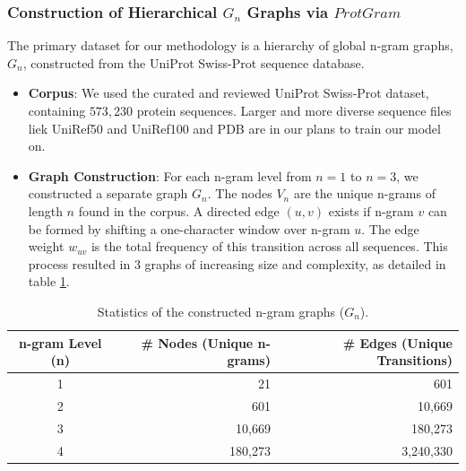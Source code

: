 \documentclass[utf8]{FrontiersinHarvard}
\begin{document}
	\subsubsection{Construction of Hierarchical $G_{n}$ Graphs via $ProtGram$}
	The primary dataset for our methodology is a hierarchy of global n-gram graphs, $G_{n}$, constructed from the UniProt Swiss-Prot sequence database.
	\begin{itemize}
		\item \textbf{Corpus}: We used the curated and reviewed UniProt Swiss-Prot dataset, containing $573,230$ protein sequences. Larger and more diverse sequence files liek UniRef50 and UniRef100 and PDB are in our plans to train our model on.
		\item \textbf{Graph Construction}: For each n-gram level from $n=1$ to $n=3$, we constructed a separate graph $G_{n}$. The nodes $V_{n}$ are the unique n-grams of length $n$ found in the corpus. A directed edge $(u, v)$ exists if n-gram $v$ can be formed by shifting a one-character window over n-gram $u$. The edge weight $w_{uv}$ is the total frequency of this transition across all sequences. This process resulted in $3$ graphs of increasing size and complexity, as detailed in table \ref{tab:gn_stats}.
	\end{itemize}
	
	\begin{table}[h!]
		\centering
		\caption{Statistics of the constructed n-gram graphs ($G_{n}$).}
		\label{tab:gn_stats}
		\begin{tabular}{crr}
			\toprule
			\textbf{n-gram Level (n)} & \textbf{\# Nodes (Unique n-grams)} & \textbf{\# Edges (Unique Transitions)} \\
			\midrule
			1                         & 21                                 & 601                                    \\
			2                         & 601                                & 10,669                                 \\
			3                         & 10,669                             & 180,273                                \\
			4                         & 180,273                            & 3,240,330                              \\
			\bottomrule
		\end{tabular}
	\end{table}
	
\end{document}

